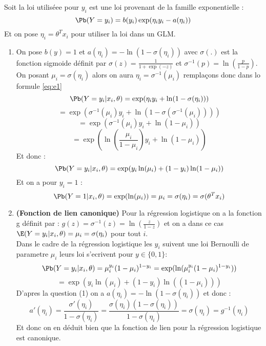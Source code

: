 \documentclass[12pt]{article}
\begin{document}
Soit la loi utiliséee pour $y_i$ est une loi provenant de la famille exponentielle :
\begin{equation}
    \Pb(Y=y_i) = b(y_i) \exp(\eta_iy_i-a(\eta_i))
    \label{eq:e1}
\end{equation}
Et on pose $\eta_i = \theta^Tx_i$ pour utiliser la loi dans un GLM.
\begin{enumerate}[1)]
    \item On pose $b(y) = 1$  et $a(\eta_i) = - \ln(1-\sigma(\eta_i))$ avec $\sigma(.)$ est la fonction sigmoide définit par $\sigma(z) = \frac{1}{1+\exp(-z)}$ et $\sigma^{-1}(p)=\ln(\frac{p}{1-p})$.   
     \\
     On posant $\mu_i = \sigma(\eta_i)$ alors on aura $\eta_i = \sigma^{-1}(\mu_i)$ remplaçons donc dans lo formule \eqref{eq:e1}
     $$
      \Pb(Y=y_i \lvert x_i,\theta ) = \exp(\eta_iy_i+\ln(1-\sigma(\eta_i)))
     $$
     $$
      = \exp(\sigma^{-1}(\mu_i)y_i+\ln(1-\sigma(\sigma^{-1}(\mu_i))))
     $$
     $$
      = \exp(\sigma^{-1}(\mu_i)y_i+\ln(1-\mu_i))
     $$
     $$
      = \exp(\ln(\frac{\mu_i}{1-\mu_i})y_i+\ln(1-\mu_i))
     $$
     Et donc :
     $$
     \Pb(Y=y_i \lvert x_i,\theta ) = \exp(y_i\ln(\mu_i) +(1-y_i)\ln(1-\mu_i))
     $$
     Et on a pour $y_i=1$ : 
     $$
     \Pb(Y=1 \lvert x_i,\theta ) = \exp(\ln(\mu_i)) = \mu_i = \sigma(\eta_i)=\sigma(\theta^Tx_i)
     $$
     \item \textbf{(Fonction de lien canonique)} Pour la régression logistique on a la fonction g définit par : $g(z) = \sigma^{-1}(z) = \ln(\frac{z}{1-z})$ et on a dans ce cas $\E(Y=y_i\lvert x_i,\theta) = \mu_i = \sigma(\eta_i)$ pour tout $i$.\\
     Dans le cadre de la régression logistique les $y_i$ suivent une loi Bernoulli de parametre $\mu_i$ leurs loi s'ecrivent pour $y\in \{0,1\}$: 
     $$
     \Pb(Y = y_i \lvert x_i,\theta ) =\mu_i^{y_i}(1-\mu_i)^{1-y_i} = \exp(\ln(\mu_i^{y_i}(1-\mu_i)^{1-y_i}))
     $$
     $$
     =\exp(y_i\ln(\mu_i)+(1-y_i)\ln((1-\mu_i)))
     $$
     D'apres la question (1) on a $a(\eta_i) = - \ln(1-\sigma(\eta_i))$ et donc : 
     $$
     a'(\eta_i)=\frac{\sigma'(\eta_i)}{1-\sigma(\eta_i)} = \frac{\sigma(\eta_i)(1-\sigma(\eta_i))}{1-\sigma(\eta_i)} = \sigma(\eta_i) = g^{-1}(\eta_i)
     $$
     Et donc on en déduit bien que la fonction de lien pour la régression logistique est canonique.
     
\end{enumerate}
\end{document}
